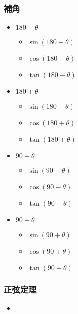 \documentclass[10pt,dvipdfmx]{jsarticle}
\begin{document}
\subsubsection*{補角}
\begin{multicols}{4}
  \begin{itemize}
    \item $180-\theta$
          \begin{itemize}
            \item $\sin(180-\theta)$
            \item $\cos(180-\theta)$
            \item $\tan(180-\theta)$
          \end{itemize}
    \item $180+\theta$
          \begin{itemize}
            \item $\sin(180+\theta)$
            \item $\cos(180+\theta)$
            \item $\tan(180+\theta)$
          \end{itemize}
    \item $90-\theta$
          \begin{itemize}
            \item $\sin(90-\theta)$
            \item $\cos(90-\theta)$
            \item $\tan(90-\theta)$
          \end{itemize}
    \item $90+\theta$
          \begin{itemize}
            \item $\sin(90+\theta)$
            \item $\cos(90+\theta)$
            \item $\tan(90+\theta)$
          \end{itemize}
  \end{itemize}

\end{multicols}

\subsubsection*{正弦定理}
\begin{LARGE}
  \begin{itemize}
    \item
  \end{itemize}
\end{LARGE}
\end{document}
